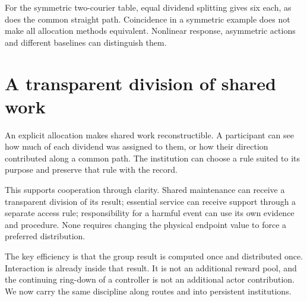 For the symmetric two-courier table, equal dividend splitting gives six each, as does the common straight path. Coincidence in a symmetric example does not make all allocation methods equivalent. Nonlinear response, asymmetric actions and different baselines can distinguish them.

\section{A transparent division of shared work}
An explicit allocation makes shared work reconstructible. A participant can see how much of each dividend was assigned to them, or how their direction contributed along a common path. The institution can choose a rule suited to its purpose and preserve that rule with the record.

This supports cooperation through clarity. Shared maintenance can receive a transparent division of its result; essential service can receive support through a separate access rule; responsibility for a harmful event can use its own evidence and procedure. None requires changing the physical endpoint value to force a preferred distribution.

The key efficiency is that the group result is computed once and distributed once. Interaction is already inside that result. It is not an additional reward pool, and the continuing ring-down of a controller is not an additional actor contribution. We now carry the same discipline along routes and into persistent institutions.
